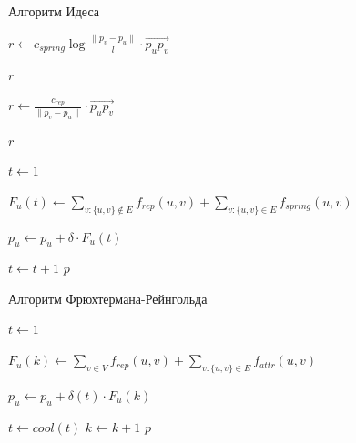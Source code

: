 \documentclass{beamer}
\begin{document}
\begin{frame}{Алгоритм Идеса}
	\begin{algorithm}[H]
		\caption{Алгоритм Идеса}
		\begin{algorithmic}[1]
			{\ttfamily \small{
					\State $r \gets c_{spring}\log{\frac{\|p_v - p_u \|}{l}}  \cdot \overrightarrow{p_u p_v}$

					\Return $r$
					\EndFunction


					\State $r \gets \frac{c_{rep}}{\|p_v - p_u \|} \cdot \overrightarrow{p_u p_v}  $

					\Return $r$
					\EndFunction


					\State $t \gets 1$

					\State $F_{u}(t) \gets \sum_{v:\{u,v\} \notin E}{f_{rep}(u, v)} + \sum_{v:\{u,v\} \in E}{f_{spring}(u, v)}$


					\EndFor
					\State $p_u \gets p_u + \delta \cdot F_u(t)$
					\EndFor

					\State $t \gets t + 1$
					\EndWhile
					\Return $p$
					\EndFunction

				}}

		\end{algorithmic}
	\end{algorithm}
\end{frame}
\begin{frame}{Алгоритм Фрюхтермана-Рейнгольда}
	\begin{algorithm}[H]
		\caption{Основной алгоритм}
		\begin{algorithmic}[1]

			{\ttfamily \small{
					\State $t \gets 1$

					\State $F_{u}(k) \gets \sum_{v \in V}{f_{rep}(u, v)} + \sum_{v:\{u,v\} \in E}{f_{attr}(u, v)}$


					\EndFor
					\State $p_u \gets p_u + \delta(t) \cdot F_u(k)$
					\EndFor

					\State $t \gets cool(t)$
					\State $k \gets k + 1$
					\EndWhile
					\Return $p$
					\EndFunction
				}}

		\end{algorithmic}
	\end{algorithm}
\end{frame}
\end{document}
